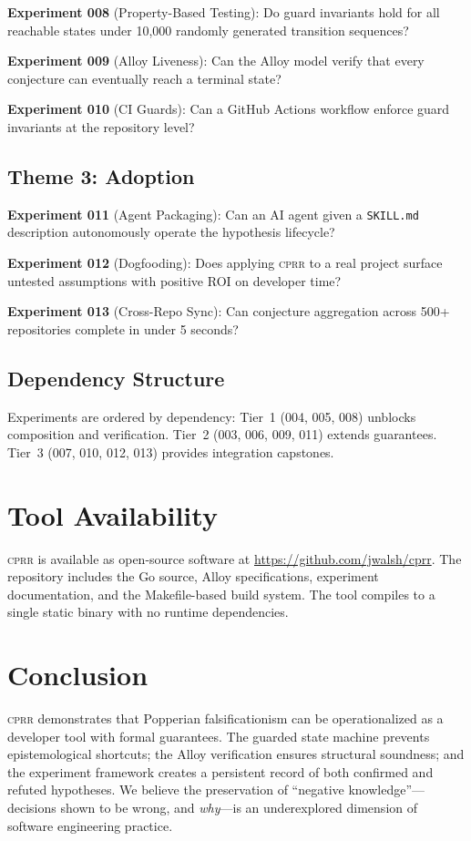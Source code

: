 \documentclass[sigconf,screen]{acmart}
\begin{document}
\textbf{Experiment 008} (Property-Based Testing): Do guard invariants hold for all reachable states under 10,000 randomly generated transition sequences?

\textbf{Experiment 009} (Alloy Liveness): Can the Alloy model verify that every conjecture can eventually reach a terminal state?

\textbf{Experiment 010} (CI Guards): Can a GitHub Actions workflow enforce guard invariants at the repository level?

\subsection{Theme 3: Adoption}

\textbf{Experiment 011} (Agent Packaging): Can an AI agent given a \texttt{SKILL.md} description autonomously operate the hypothesis lifecycle?

\textbf{Experiment 012} (Dogfooding): Does applying \textsc{cprr} to a real project surface untested assumptions with positive ROI on developer time?

\textbf{Experiment 013} (Cross-Repo Sync): Can conjecture aggregation across 500+ repositories complete in under 5 seconds?

\subsection{Dependency Structure}

Experiments are ordered by dependency: Tier~1 (004, 005, 008) unblocks composition and verification. Tier~2 (003, 006, 009, 011) extends guarantees. Tier~3 (007, 010, 012, 013) provides integration capstones.

\section{Tool Availability}

\textsc{cprr} is available as open-source software at \url{https://github.com/jwalsh/cprr}. The repository includes the Go source, Alloy specifications, experiment documentation, and the Makefile-based build system. The tool compiles to a single static binary with no runtime dependencies.

\section{Conclusion}

\textsc{cprr} demonstrates that Popperian falsificationism can be operationalized as a developer tool with formal guarantees. The guarded state machine prevents epistemological shortcuts; the Alloy verification ensures structural soundness; and the experiment framework creates a persistent record of both confirmed and refuted hypotheses. We believe the preservation of ``negative knowledge''---decisions shown to be wrong, and \emph{why}---is an underexplored dimension of software engineering practice.
\end{document}
